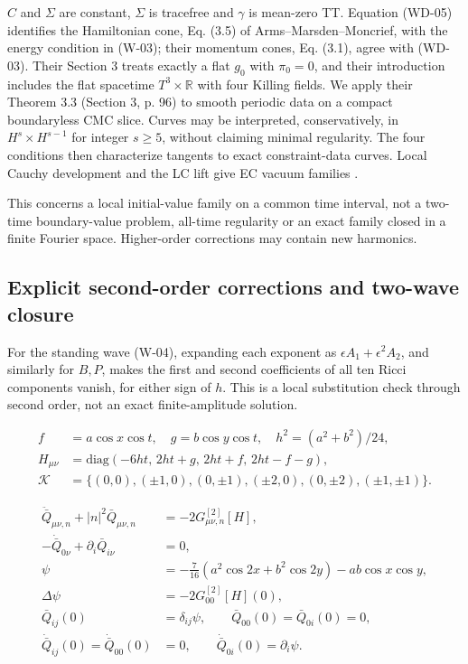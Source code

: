 $C$ and $\Sigma$ are constant, $\Sigma$ is tracefree and $\gamma$ is mean-zero TT. Equation (WD-05) identifies the Hamiltonian cone, Eq. (3.5) of Arms--Marsden--Moncrief, with the energy condition in (W-03); their momentum cones, Eq. (3.1), agree with (WD-03). Their Section 3 treats exactly a flat $g_0$ with $\pi_0=0$, and their introduction includes the flat spacetime $T^3\times\mathbb R$ with four Killing fields. We apply their Theorem 3.3 (Section 3, p. 96) to smooth periodic data on a compact boundaryless CMC slice. Curves may be interpreted, conservatively, in $H^s\times H^{s-1}$ for integer $s\ge5$, without claiming minimal regularity. The four conditions then characterize tangents to exact constraint-data curves. Local Cauchy development and the LC lift give EC vacuum families \cite{ArmsMarsdenMoncrief1982}.

This concerns a local initial-value family on a common time interval, not a two-time boundary-value problem, all-time regularity or an exact family closed in a finite Fourier space. Higher-order corrections may contain new harmonics.

\subsection{Explicit second-order corrections and two-wave closure}

For the standing wave (W-04), expanding each exponent as $\epsilon A_1+\epsilon^2A_2$, and similarly for $B,P$, makes the first and second coefficients of all ten Ricci components vanish, for either sign of $h$. This is a local substitution check through second order, not an exact finite-amplitude solution.

\begin{equation}\tag{WD-06}\label{eq:WD-06}
\begin{aligned}
f&=a\cos x\cos t,\quad g=b\cos y\cos t,\quad h^2=(a^2+b^2)/24,\\
H_{\mu\nu}&=\mathrm{diag}(-6ht,\,2ht+g,\,2ht+f,\,2ht-f-g),\\
\mathcal K&=\{(0,0),(\pm1,0),(0,\pm1),(\pm2,0),(0,\pm2),(\pm1,\pm1)\}.
\end{aligned}
\end{equation}

\begin{equation}\tag{WD-07}\label{eq:WD-07}
\begin{aligned}
\ddot{\bar Q}_{\mu\nu,n}+|n|^2\bar Q_{\mu\nu,n}&=-2G^{[2]}_{\mu\nu,n}[H],\\
-\dot{\bar Q}_{0\nu}+\partial_i\bar Q_{i\nu}&=0,\\
\psi&=-\tfrac7{16}(a^2\cos2x+b^2\cos2y)-ab\cos x\cos y,\\
\Delta\psi&=-2G^{[2]}_{00}[H](0),\\
\bar Q_{ij}(0)&=\delta_{ij}\psi,\qquad \bar Q_{00}(0)=\bar Q_{0i}(0)=0,\\
\dot{\bar Q}_{ij}(0)=\dot{\bar Q}_{00}(0)&=0,\qquad \dot{\bar Q}_{0i}(0)=\partial_i\psi.
\end{aligned}
\end{equation}

